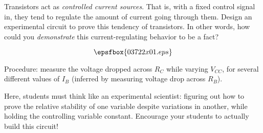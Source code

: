 

Transistors act as {\it controlled current sources}.  That is, with a fixed control signal in, they tend to regulate the amount of current going through them.  Design an experimental circuit to prove this tendency of transistors.  In other words, how could you {\it demonstrate} this current-regulating behavior to be a fact?







$$\epsfbox{03722x01.eps}$$

\vskip 10pt

Procedure: measure the voltage dropped across $R_C$ while varying $V_{CC}$, for several different values of $I_B$ (inferred by measuring voltage drop across $R_B$).







Here, students must think like an experimental scientist: figuring out how to prove the relative stability of one variable despite variations in another, while holding the controlling variable constant.  Encourage your students to actually build this circuit!




